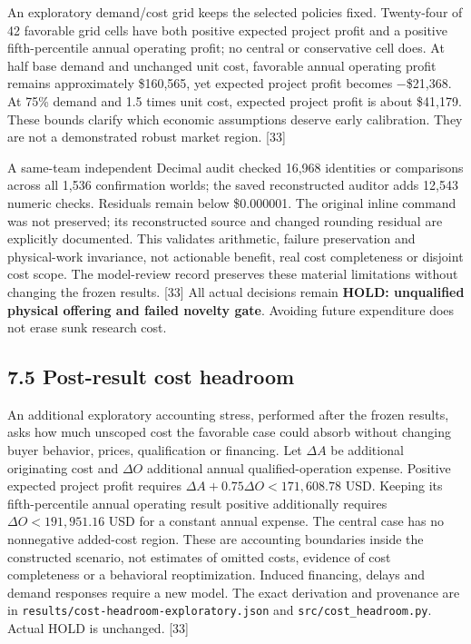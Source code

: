 \documentclass[
  11pt,
]{article}
\begin{document}
An exploratory demand/cost grid keeps the selected policies fixed.
Twenty-four of 42 favorable grid cells have both positive expected
project profit and a positive fifth-percentile annual operating profit;
no central or conservative cell does. At half base demand and unchanged
unit cost, favorable annual operating profit remains approximately
\$160,565, yet expected project profit becomes −\$21,368. At 75\% demand
and 1.5 times unit cost, expected project profit is about \$41,179.
These bounds clarify which economic assumptions deserve early
calibration. They are not a demonstrated robust market region. {[}33{]}

A same-team independent Decimal audit checked 16,968 identities or
comparisons across all 1,536 confirmation worlds; the saved
reconstructed auditor adds 12,543 numeric checks. Residuals remain below
\$0.000001. The original inline command was not preserved; its
reconstructed source and changed rounding residual are explicitly
documented. This validates arithmetic, failure preservation and
physical-work invariance, not actionable benefit, real cost completeness
or disjoint cost scope. The model-review record preserves these material
limitations without changing the frozen results. {[}33{]} All actual
decisions remain \textbf{HOLD: unqualified physical offering and failed
novelty gate}. Avoiding future expenditure does not erase sunk research
cost.

\hypertarget{post-result-cost-headroom}{%
\subsection{7.5 Post-result cost
headroom}\label{post-result-cost-headroom}}

An additional exploratory accounting stress, performed after the frozen
results, asks how much unscoped cost the favorable case could absorb
without changing buyer behavior, prices, qualification or financing. Let
\(\Delta A\) be additional originating cost and \(\Delta O\) additional
annual qualified-operation expense. Positive expected project profit
requires \(\Delta A+0.75\Delta O<171{,}608.78\) USD. Keeping its
fifth-percentile annual operating result positive additionally requires
\(\Delta O<191{,}951.16\) USD for a constant annual expense. The central
case has no nonnegative added-cost region. These are accounting
boundaries inside the constructed scenario, not estimates of omitted
costs, evidence of cost completeness or a behavioral reoptimization.
Induced financing, delays and demand responses require a new model. The
exact derivation and provenance are in
\nolinkurl{results/cost-headroom-exploratory.json} and
\nolinkurl{src/cost_headroom.py}. Actual HOLD is unchanged. {[}33{]}
\end{document}
